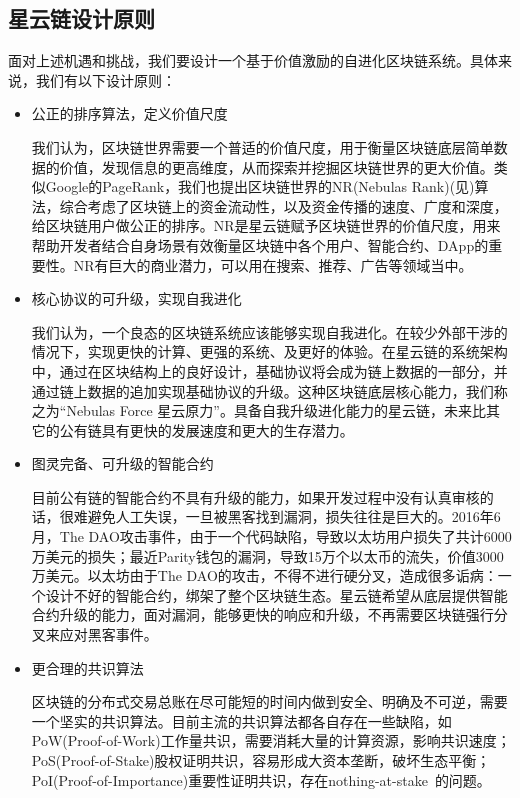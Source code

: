 \subsection{星云链设计原则}
面对上述机遇和挑战，我们要设计一个基于价值激励的自进化区块链系统。具体来说，我们有以下设计原则：
\begin{itemize}
	\item 公正的排序算法，定义价值尺度

我们认为，区块链世界需要一个普适的价值尺度，用于衡量区块链底层简单数据的价值，发现信息的更高维度，从而探索并挖掘区块链世界的更大价值。类似Google的PageRank\cite{Brin2010}\cite{page1999pagerank}，我们也提出区块链世界的NR(Nebulas Rank)(见)算法，综合考虑了区块链上的资金流动性，以及资金传播的速度、广度和深度，给区块链用户做公正的排序。NR是星云链赋予区块链世界的价值尺度，用来帮助开发者结合自身场景有效衡量区块链中各个用户、智能合约、DApp的重要性。NR有巨大的商业潜力，可以用在搜索、推荐、广告等领域当中。

	\item 核心协议的可升级，实现自我进化

我们认为，一个良态的区块链系统应该能够实现自我进化。在较少外部干涉的情况下，实现更快的计算、更强的系统、及更好的体验。在星云链的系统架构中，通过在区块结构上的良好设计，基础协议将会成为链上数据的一部分，并通过链上数据的追加实现基础协议的升级。这种区块链底层核心能力，我们称之为“Nebulas Force 星云原力”。具备自我升级进化能力的星云链，未来比其它的公有链具有更快的发展速度和更大的生存潜力。

	\item 图灵完备、可升级的智能合约

目前公有链的智能合约不具有升级的能力，如果开发过程中没有认真审核的话，很难避免人工失误，一旦被黑客找到漏洞，损失往往是巨大的。2016年6月，The DAO攻击事件，由于一个代码缺陷，导致以太坊用户损失了共计6000万美元的损失；最近Parity钱包的漏洞，导致15万个以太币的流失，价值3000万美元。以太坊由于The DAO的攻击，不得不进行硬分叉，造成很多诟病：一个设计不好的智能合约，绑架了整个区块链生态。星云链希望从底层提供智能合约升级的能力，面对漏洞，能够更快的响应和升级，不再需要区块链强行分叉来应对黑客事件。

	\item 更合理的共识算法

区块链的分布式交易总账在尽可能短的时间内做到安全、明确及不可逆，需要一个坚实的共识算法。目前主流的共识算法都各自存在一些缺陷，如PoW(Proof-of-Work)工作量共识，需要消耗大量的计算资源，影响共识速度；PoS(Proof-of-Stake)股权证明共识，容易形成大资本垄断，破坏生态平衡；PoI(Proof-of-Importance)重要性证明共识，存在nothing-at-stake~\cite{nothingatstake}的问题。 


\end{itemize}
